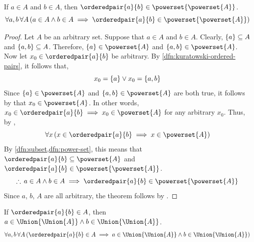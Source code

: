 \begin{thm}
    \label{thm:ordered-pair-belongs-to-the-power-set-of-the-powerset}
    If \( a \in A \) and \( b \in A \), then \( \orderedpair{a}{b} \in \powerset{\powerset{A}} \).
    \begin{equation*}
        \forall a,b \, \forall A \, \mleft( a \in A \land b \in A \implies \orderedpair{a}{b} \in \powerset{\powerset{A}} \mright)
    \end{equation*}
\end{thm}

\begin{proof}
    Let \( A \) be an arbitrary set. Suppose that \( a \in A \) and \( b \in A \). Clearly, \( \mleft\{ a \mright\} \subseteq A \)
    and \( \mleft\{ a, b \mright\} \subseteq A \). Therefore, \( \mleft\{ a \mright\} \in \powerset{A} \) and
    \( \mleft\{ a, b \mright\} \in \powerset{A} \). Now let \( x_{0} \in \orderedpair{a}{b}\)
    be arbitrary. By \cref{dfn:kuratowski-ordered-pairs}, it follows that,
    \begin{equation*}
        x_{0} = \mleft\{ a \mright\} \lor x_{0} = \mleft\{ a, b \mright\}
    \end{equation*}
    Since \( \mleft\{ a \mright\} \in \powerset{A} \) and \( \mleft\{ a, b \mright\} \in \powerset{A} \) are both true, it follows
    by  that \( x_{0} \in \powerset{A} \).
    In other words, \( x_{0} \in \orderedpair{a}{b} \implies x_{0} \in \powerset{A} \)
    for any arbitrary \( x_{0} \). Thus, by ,
    \begin{equation*}
        \forall x \, \mleft( x \in \orderedpair{a}{b} \implies x \in \powerset{A} \mright)
    \end{equation*}
    By \cref{dfn:subset,dfn:power-set}, this means that \( \orderedpair{a}{b} \subseteq \powerset{A} \) and \( \orderedpair{a}{b} \in \powerset{\powerset{A}} \).
    \begin{equation*}
        \therefore \,
        a \in A \land b \in A
        \implies
        \orderedpair{a}{b} \in \powerset{\powerset{A}}
    \end{equation*}
    Since \( a \), \( b \), \( A \) are all arbitrary, the theorem follows by .
\end{proof}

\begin{thm}
    \label{thm:the-coordinates-of-an-orderedpair-belongs-to-the-union-of-the-union-of-the-set-containing-the-orderpair}
    If \( \orderedpair{a}{b} \in A \), then \( a \in \Union{\Union{A}} \land b \in \Union{\Union{A}} \).
    \begin{equation*}
        \forall a,b \, \forall A \, \mleft( \orderedpair{a}{b} \in A \implies
        a \in \Union{\Union{A}} \land b \in \Union{\Union{A}}\mright)
    \end{equation*}
\end{thm}

